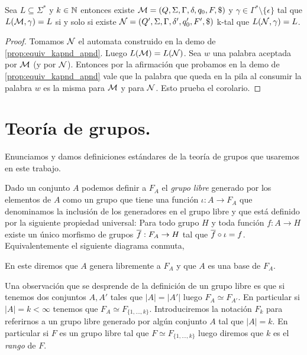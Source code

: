 \documentclass[tesis.tex]{subfiles}
\begin{document}
\begin{coro}
	\label{coro:equiv_kapnd_apnd_esp}
	Sea $L \subseteq \Sigma^{*}$ y $k \in \mathbb{N}$ entonces existe 
	${\cal M } = (Q, \Sigma, \Gamma, \delta, q_0, F, \$)$ 
	\APD y $\gamma \in \Gamma^{*} \setminus \{ \epsilon \}$ tal que $L({\cal M}, \gamma) =  L$ 
	si y solo si existe ${\cal N} = (Q', \Sigma, \Gamma, \delta', q_0', F', \$)$ k-\APD tal que $L({\cal N},\gamma) = L$.
\end{coro}
\begin{proof}
	Tomamos $\cal N$ el automata construido en la demo de \ref{prop:equiv_kapnd_apnd}.
	Luego $L({\cal M})=L({\cal N})$. 
	Sea $w$ una palabra aceptada por $\cal M$ (y por $\cal N$). 
	Entonces por la afirmación que probamos en la demo de \ref{prop:equiv_kapnd_apnd} vale que la palabra que queda en la pila al consumir la palabra $w$ es la misma para $\cal M$ y para $\cal N$. 
	Esto prueba el corolario.

\end{proof}


\section{Teoría de grupos.}\label{secc_teo_grp}

Enunciamos y damos definiciones estándares de la teoría de grupos que usaremos en este trabajo.


\begin{deff}
	Dado un conjunto $A$ podemos definir a $F_{A}$ el \emph{grupo libre} generado por los elementos de $A$ como un grupo que tiene una función  $\iota: A \to F_{A}$ que denominamos la inclusión de los generadores en el grupo libre y que está definido por la siguiente propiedad universal: 
	Para todo grupo $H$ y toda función $f:A \to H$ existe un único morfismo de grupos $\overline f: F_{A} \to H$ tal que $\overline f \circ \iota = f$.
	Equivalentemente el siguiente diagrama conmuta,
	\begin{center}
	\end{center}
	En este diremos que $A$ genera libremente a $F_{A}$ y que $A$ es una base de $F_{A}$.
\end{deff}

\begin{obs}
	Una observación que se desprende de la definición de un grupo libre es que si tenemos dos conjuntos $A, A'$ tales que $|A| = |A'|$ luego $F_{A} \simeq F_{A'}$.
	En particular si $|A|=k < \infty$ tenemos que $F_{A} \simeq F_{ \{1, \dots, k \} }$.
	Introduciremos la notación $F_{k}$ para referirnos a un grupo libre generado por algún conjunto $A$ tal que $|A| = k$.
	En particular si $F$ es un grupo libre tal que $F \simeq F_{\{ 1, \dots, k \}}$ luego diremos que $k$ es el \emph{rango} de $F$.
\end{obs}
\end{document}
